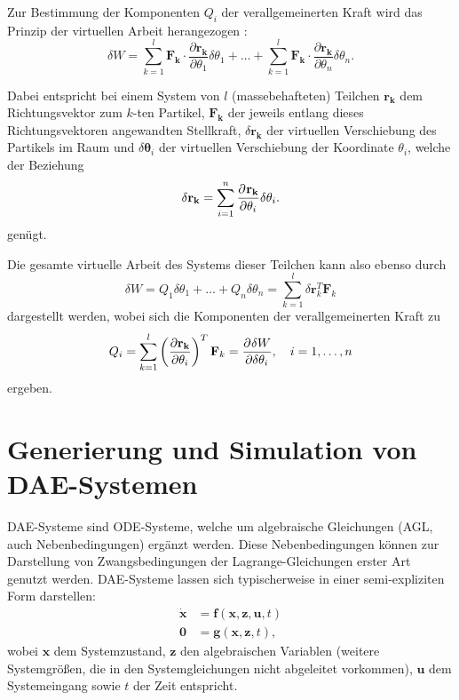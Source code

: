 Zur Bestimmung der Komponenten $Q_i$ der verallgemeinerten Kraft wird das Prinzip der virtuellen Arbeit herangezogen \cite{VirtualWork}:
\begin{equation}
	\delta W = \sum_{k=1}^l \mathbf{F_k} \cdot \frac{\partial \mathbf{r_k}}{\partial \theta_1} \delta \theta_1 +\ldots + \sum_{k=1}^l \mathbf{F_k} \cdot \frac{\partial \mathbf{r_k}}{\partial \theta_n} \delta \theta_n.
\end{equation}

Dabei entspricht bei einem System von $l$ (massebehafteten) Teilchen $\mathbf{r_k}$ dem Richtungsvektor zum $k$-ten Partikel, $\mathbf{F_k}$ der jeweils entlang dieses Richtungsvektoren angewandten Stellkraft, $\delta \mathbf{r_{k}}$ der virtuellen Verschiebung des Partikels im Raum und $\delta \boldsymbol{\theta}_{i}$ der virtuellen Verschiebung der Koordinate $\theta_i$, welche der Beziehung
\begin{equation}
	\delta \mathbf{r_{k}} = \sum_{i = 1}^{n} \frac{\partial^{}\mathbf{r_{k}}}{\partial{\theta_i}^{}} \delta \theta_i.
\end{equation}
genügt.

Die gesamte virtuelle Arbeit des Systems dieser Teilchen kann also ebenso durch
\begin{equation}
\label{eq:virtual_work}
\delta W = Q_1 \delta \theta_1 + \ldots + Q_n\delta \theta_n = \sum_{k=1}^{l}\delta \mathbf{r}_k^T \mathbf{F}_k
\end{equation}
dargestellt werden, wobei sich die Komponenten der verallgemeinerten Kraft zu
\begin{equation}
\label{eq:virtual_work_force}
Q_i = \sum_{k=1}^l \left(\frac {\partial \mathbf{r_k}} {\partial \theta_i} \right)^T \mathbf {F}_{k} = \frac{\partial^{}\delta W}{\partial{\delta \theta_i}^{}} ,\quad i=1,\ldots, n 
\end{equation}
ergeben.
\section{Generierung und Simulation von DAE-Systemen}
DAE-Systeme sind ODE-Systeme, welche um algebraische Gleichungen (AGL, auch Nebenbedingungen) ergänzt werden. Diese Nebenbedingungen können zur Darstellung von Zwangsbedingungen der Lagrange-Gleichungen erster Art genutzt werden. DAE-Systeme lassen sich typischerweise in einer semi-expliziten Form darstellen:
	\begin{align}\label{eq:dae_std}
		\mathbf{\dot{x}} &= \mathbf{f}(\mathbf{x}, \mathbf{z}, \mathbf{u}, t) \\
		\mathbf{0} &= \mathbf{g}(\mathbf{x}, \mathbf{z}, t),
	\end{align}
wobei $\mathbf{x}$ dem Systemzustand, $\mathbf{z}$ den algebraischen Variablen (weitere Systemgrößen, die in den Systemgleichungen nicht abgeleitet vorkommen), $\mathbf{u}$ dem Systemeingang sowie $t$ der Zeit entspricht. \cite[S.137]{JanschekSystementwurf}

